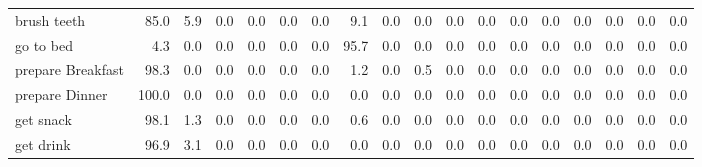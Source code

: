 \documentclass{article}
\begin{document}
\begin{sideways}
\begin{tabular}{lrrrrrrrrrrrrrrrrr}
brush teeth                   &        85.0 &                5.9 &           0.0 &               0.0 &                0.0 &                0.0 &              9.1 &                      0.0 &                   0.0 &              0.0 &              0.0 &                            0.0 &                      0.0 &                    0.0 &                                  0.0 &                          0.0 &                  0.0 \\
go to bed                     &         4.3 &                0.0 &           0.0 &               0.0 &                0.0 &                0.0 &             95.7 &                      0.0 &                   0.0 &              0.0 &              0.0 &                            0.0 &                      0.0 &                    0.0 &                                  0.0 &                          0.0 &                  0.0 \\
prepare Breakfast             &        98.3 &                0.0 &           0.0 &               0.0 &                0.0 &                0.0 &              1.2 &                      0.0 &                   0.5 &              0.0 &              0.0 &                            0.0 &                      0.0 &                    0.0 &                                  0.0 &                          0.0 &                  0.0 \\
prepare Dinner                &       100.0 &                0.0 &           0.0 &               0.0 &                0.0 &                0.0 &              0.0 &                      0.0 &                   0.0 &              0.0 &              0.0 &                            0.0 &                      0.0 &                    0.0 &                                  0.0 &                          0.0 &                  0.0 \\
get snack                     &        98.1 &                1.3 &           0.0 &               0.0 &                0.0 &                0.0 &              0.6 &                      0.0 &                   0.0 &              0.0 &              0.0 &                            0.0 &                      0.0 &                    0.0 &                                  0.0 &                          0.0 &                  0.0 \\
get drink                     &        96.9 &                3.1 &           0.0 &               0.0 &                0.0 &                0.0 &              0.0 &                      0.0 &                   0.0 &              0.0 &              0.0 &                            0.0 &                      0.0 &                    0.0 &                                  0.0 &                          0.0 &                  0.0 \\

\end{tabular}
\end{sideways}
\end{document}
